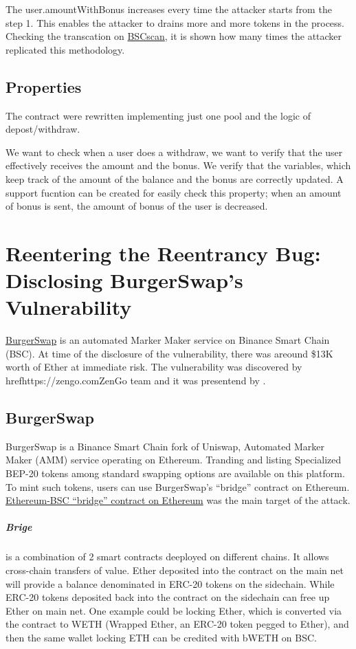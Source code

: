 The user.amountWithBonus increases every time the attacker starts from the step 1. 
This enables the attacker to drains more and more tokens in the process. 
Checking the transcation on \href{https://bscscan.com/txs?a=0x36ad9ee78bfb730955993d2aa77ecccf95e3313e&p=3}{BSCscan}, it is shown how many times the attacker 
replicated this methodology. 

\subsection{Properties}
The contract were rewritten implementing just one pool and the logic of depost/withdraw. 

We want to check when a user does a withdraw, we want to verify that the user effectively receives the amount and the bonus. We verify that the variables, which 
keep track of the amount of the balance and the bonus are correctly updated. 
A support fucntion can be created for easily check this property; when an amount of bonus is sent, the amount of bonus of the user is decreased.


\section{Reentering the Reentrancy Bug: Disclosing BurgerSwap's Vulnerability}   
\label{sec:Exploits:BurgerSwap}
\href{https://burgerswap.org/trade/swap}{BurgerSwap} is an automated Marker Maker service on Binance Smart Chain (BSC). 
At time of the disclosure of the vulnerability, there was areound \$13K worth of Ether at immediate risk.
The vulnerability was discovered by href{https://zengo.com}{ZenGo} team and it was presentend by \citet{BurgerSwap}.

\subsection{BurgerSwap}
\label{sec:BurgerSwap:brige}
BurgerSwap is a Binance Smart Chain fork of Uniswap, Automated Marker Maker (AMM) service operating on Ethereum. 
Tranding and listing Specialized BEP-20 tokens among standard swapping options are available on this platform. 
To mint such tokens, users can use 
BurgerSwap's “bridge” contract on Ethereum. 
\href{https://etherscan.io/address/0xaf5dcebba2f8bec8729117336b2fe8b4e0d99b0b#code}{Ethereum-BSC “bridge” contract on Ethereum} was the main target of the attack.

\subparagraph{Brige} is a combination of 2 smart contracts deeployed on different chains. 
It allows cross-chain transfers of value. Ether deposited into the contract on 
the main net will provide a balance denominated in ERC-20 tokens on the sidechain. 
While ERC-20 tokens deposited back into the contract on the sidechain can free up Ether on main net.
One example could be locking Ether, which is converted via the contract to WETH 
(Wrapped Ether, an ERC-20 token pegged to Ether), and then the same wallet locking ETH can be credited with bWETH on BSC.

